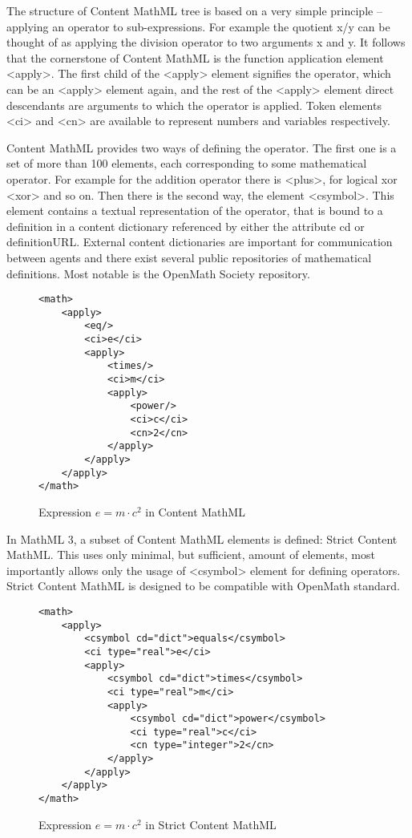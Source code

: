 \documentclass[11pt,oneside,final]{fithesis2}
\begin{document}
The structure of Content MathML tree is based on a very simple principle – applying an operator to sub-expressions. For example the quotient x/y can be thought of as applying the division operator to two arguments x and y. It follows that the cornerstone of Content MathML is the function application element <apply>.  The first child of the <apply> element signifies the operator, which can be an <apply> element again, and the rest of the <apply> element direct descendants are arguments to which the operator is applied. Token elements <ci> and <cn> are available to represent numbers and variables respectively. 

Content MathML provides two ways of defining the operator. The first one is a set of more than 100 elements, each corresponding to some mathematical operator. For example for the addition operator there is <plus>, for logical xor <xor> and so on. Then there is the second way, the element <csymbol>. This element contains a textual representation of the operator, that is bound to a definition in a content dictionary referenced by either the attribute cd or definitionURL. External content dictionaries are important for communication between agents and there exist several public repositories of mathematical definitions. Most notable is the OpenMath Society repository.

\begin{figure}[!ht]
\lstset{language=XML,frame=lines}
\begin{lstlisting}
<math>
	<apply>
		<eq/>
		<ci>e</ci>
		<apply>
			<times/>
			<ci>m</ci>
			<apply>
				<power/>
				<ci>c</ci>
				<cn>2</cn>
			</apply>
		</apply>
	</apply>
</math>
\end{lstlisting}
\caption{Expression $e=m \cdot c^2$ in Content MathML}
\label{fig:presentationmathml}
\end{figure}

In MathML 3, a subset of Content MathML elements is defined: Strict Content MathML. This uses only minimal, but sufficient, amount of elements, most importantly allows only the usage of <csymbol> element for defining operators. Strict Content MathML is designed to be compatible with OpenMath standard.

\begin{figure}[!ht]
\lstset{language=XML,frame=lines}
\begin{lstlisting}
<math>
	<apply>
		<csymbol cd="dict">equals</csymbol>
		<ci type="real">e</ci>
		<apply>
			<csymbol cd="dict">times</csymbol>
			<ci type="real">m</ci>
			<apply>
				<csymbol cd="dict">power</csymbol>
				<ci type="real">c</ci>
				<cn type="integer">2</cn>
			</apply>
		</apply>
	</apply>
</math>
\end{lstlisting}
\caption{Expression $e=m \cdot c^2$ in Strict Content MathML}
\label{fig:presentationmathml}
\end{figure}
\end{document}
